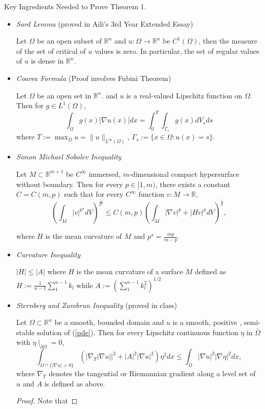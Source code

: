 \documentclass[paper=a4, fontsize=11pt]{scrartcl} %
\numberwithin{equation}{section} %
\numberwithin{figure}{section} %
\numberwithin{table}{section} %
\numberwithin{exercise}{section}
\begin{document}
 Key Ingredients Needed to Prove Theorem 1.
 \begin{itemize}
 \item  \emph{Sard Lemma} (proved in Aili's 3rd Year Extended Essay)
 
 Let $\Omega$ be an open subset of $\mathbb{R}^n$ and $u\colon \Omega\to\mathbb{R}^n$ be $C^1(\Omega)$, then the measure of  the set of critical of $u$ values is zero. In particular, the set of regular values of $u$ is dense in $\mathbb{R}^n.$
 
 
 \item \emph{Coarea Formula} (Proof involves Fubini Theorem)
 
 Let $\Omega$ be an open set in $\mathbb{R}^n$. and $ u$ is a real-valued Lipschitz function on $\Omega$. Then for $g\in L^1(\Omega)$, 
 $$\int_{\Omega} g(x) |\nabla u(x)| dx=\int_{0}^T \int_{\Gamma_s} g(x) dV_{s} ds$$
 where $T:=\max_{\Omega} u=\|u\|_{L^{\infty}(\Omega)}$, $\Gamma_s:=\{x\in\Omega \colon u(x)=s\}.$
 
 \item \emph{Simon Michael Sobolev Inequality}
 
 Let $M\subset \mathbb{R}^{m+1}$ be $C^{\infty}$ immersed, $m$-dimensional compact hypersurface without boundary. Then for every $p\in [1,m)$, there exists a constant $C=C(m,p)$ such that for every $C^\infty$ function $v\colon M\to\mathbb{R}$,
 \begin{equation}\label{sobolev}
 \left(\int_{M} |v|^{p^\star} dV\right) ^{\frac{1}{p^{\star}}}\leq C(m,p) \left(\int_{M}|\nabla v|^p+|Hv|^p dV\right) ^{\frac{1}{p}} , 
 \end{equation}
 
 where $H$ is the mean curvature of $M$ and $p^\star=\frac{mp}{m-p}.$
 \item  \emph{Curvature Inequality}

$|H|\leq |A|$ where $H$ is the mean curvature of a surface $M$ defined as  $H:=\frac{1}{n-1}\sum_{1}^{n-1} k_{l}$ while $A:=(\sum_{1}^{n-1} k_{l}^2)^{1/2}$
 \item \emph{Sternberg and Zumbrun Inequality} (proved in class)
 
 Let $\Omega\subset \mathbb{R}^n$ be a smooth, bounded domain and $u$ is a smooth, positive , semi-stable solution of (\ref{pde}). Then for every Lipschitz continuous function $\eta$ in $\bar{\Omega}$ with $\eta\mid_{\partial\Omega}=0,$
\begin{equation} \label{SZ}
\int_{\Omega\cap \{| \nabla u|>0\} } \left(|\nabla_T | \nabla u| |^2+|A|^2 |\nabla u|^2\right)\eta^2 dx \leq \int_{\Omega} | \nabla u|^2 | \nabla \eta |^2 dx,
 \end{equation}
 where $\nabla_T$ denotes the tangential or Riemannian gradient along a level set of $u$ and $A$ is defined as above.
 \begin{proof}
 Note that 


\end{proof}
\end{itemize}
\end{document}
